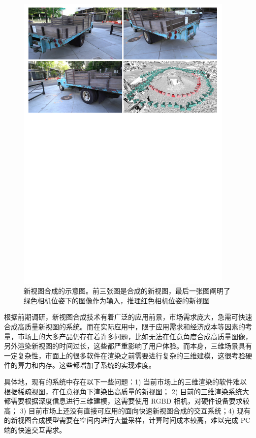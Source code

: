 \begin{figure}[tbhp]
    \centering
    \includegraphics[width=0.95\textwidth]{figures/FreeViewSynthesis.pdf}
    \caption{新视图合成的示意图\cite{riegler2020free}。前三张图是合成的新视图，最后一张图阐明了绿色相机位姿下的图像作为输入，推理红色相机位姿的新视图}
    \label{fig:FreeViewSynthesis}
\end{figure}
\newpage

根据前期调研，新视图合成技术有着广泛的应用前景，市场需求庞大，急需可快速合成高质量新视图的系统。而在实际应用中，限于应用需求和经济成本等因素的考量，市场上的大多产品仍存在着许多问题，比如无法在任意角度合成高质量图像，另外渲染新视图的时间过长，这些都严重影响了用户体验。而本身，三维场景具有一定复杂性，市面上的很多软件在渲染之前需要进行复杂的三维建模，这很考验硬件的算力和内存。这些都增加了系统的实现难度。

具体地，现有的系统中存在以下一些问题：1) 当前市场上的三维渲染的软件难以根据稀疏视图，在任意视角下渲染出高质量的新视图；
2) 目前的三维渲染系统大都需要根据深度信息进行三维建模，这需要使用 RGBD 相机，对硬件设备要求较高；
3) 目前市场上还没有直接可应用的面向快速新视图合成的交互系统；4) 现有的新视图合成模型需要在空间内进行大量采样，计算时间成本较高，难以完成 PC 端的快速交互需求。

